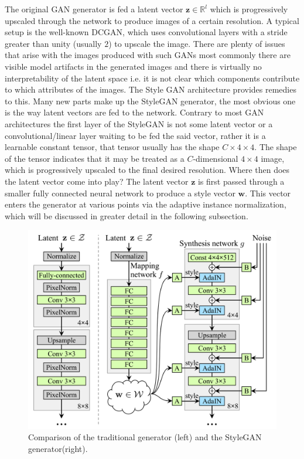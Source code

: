 \documentclass[conference]{IEEEtran}
\begin{document}
The original GAN generator is fed a latent vector $\mathbf{z} \in \mathbb{R}^l$ which is progressively upscaled through the network to produce images of a certain resolution. A typical setup is the well-known DCGAN, which uses convolutional layers with a stride greater than unity (usually $2$) to upscale the image. There are plenty of issues that arise with the images produced with such GANs most commonly there are visible model artifacts in the generated images and there is virtually no interpretability of the latent space i.e. it is not clear which components contribute to which attributes of the images. The Style GAN architecture provides remedies to this.
Many new parts make up the StyleGAN generator, the most obvious one is the way latent vectors are fed to the network. Contrary to most GAN architectures the first layer of the StyleGAN is not some latent vector or a convolutional/linear layer waiting to be fed the said vector, rather it is a learnable constant tensor, that tensor usually has the shape $C \times 4 \times 4$. The shape of the tensor indicates that it may be treated as a $C$-dimensional $4 \times 4$ image, which is progressively upscaled to the final desired resolution.
Where then does the latent vector come into play? The latent vector $\mathbf{z}$ is first passed through a smaller fully connected neural network to produce a style vector $\mathbf{w}$. This vector enters the generator at various points via the adaptive instance normalization, which will be discussed in greater detail in the following subsection.

\begin{figure}[!h]
	\begin{center}
		\includegraphics[width=1\columnwidth]{./images/stylegan.png}
		\caption{Comparison of the traditional generator (left) and the StyleGAN generator(right).}
		\label{fig:figure4}
	\end{center}
\end{figure}
\end{document}
